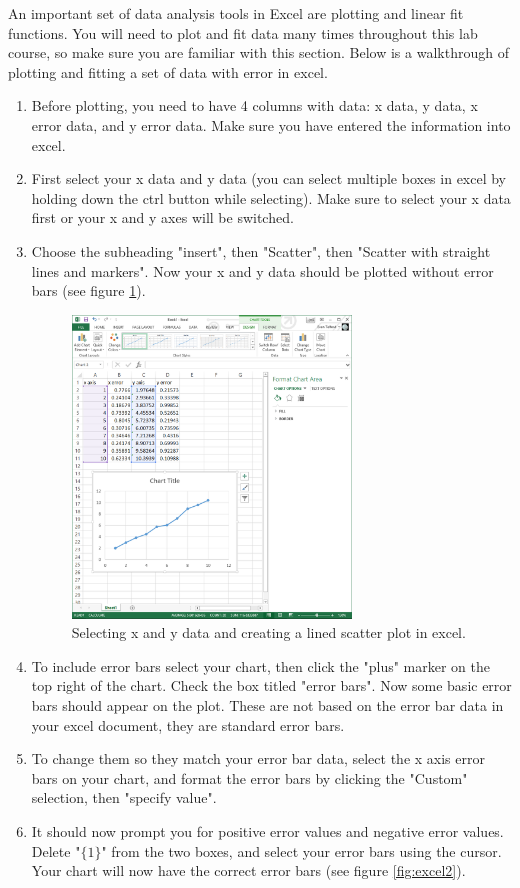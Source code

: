 An important set of data analysis tools in Excel are plotting and linear fit functions. You will need to plot and fit data many times throughout this lab course, so make sure you are familiar with this section. Below is a walkthrough of plotting and fitting a set of data with error in excel.
\begin{enumerate}
\item Before plotting, you need to have 4 columns with data: x data, y data, x error data, and y error data. Make sure you have entered the information into excel.
\item First select your x data and y data (you can select multiple boxes in excel by holding down the ctrl button while selecting). Make sure to select your x data first or your x and y axes will be switched.
\item Choose the subheading "insert", then "Scatter", then "Scatter with straight lines and markers". Now your x and y data should be plotted without error bars (see figure \ref{fig:excel1}).

\begin{figure}[h!]
\centering
\includegraphics[height=0.4\textheight, width=0.7\textwidth]{./Exp1/pic/image4.png}
\caption{Selecting x and y data and creating a lined scatter plot in excel.}
\label{fig:excel1}
\end{figure}

\item To include error bars select your chart, then click the "plus" marker on the top right of the chart. Check the box titled "error bars". Now some basic error bars should appear on the plot. These are not based on the error bar data in your excel document, they are standard error bars.
\item To change them so they match your error bar data, select the x axis error bars on your chart, and format the error bars by clicking the "Custom" selection, then "specify value".
\item It should now prompt you for positive error values and negative error values. Delete "$\{1\}$" from the two boxes, and select your error bars using the cursor. Your chart will now have the correct error bars (see figure \ref{fig:excel2}).


\end{enumerate}
